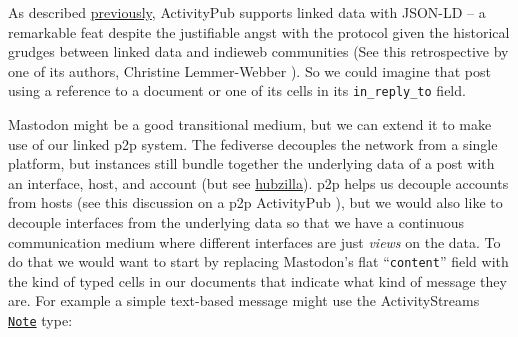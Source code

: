 \begin{Shaded}
\begin{Highlighting}[]
\FunctionTok{\{}
    \FunctionTok{:} \FunctionTok{,}
    \FunctionTok{:} \FunctionTok{,}
    \FunctionTok{:} \FunctionTok{,}
    \FunctionTok{:} \FunctionTok{,}
    \FunctionTok{:} \FunctionTok{,}
    \FunctionTok{:} \FunctionTok{,}
    \FunctionTok{:} \FunctionTok{,}
    \FunctionTok{:}
    \FunctionTok{\{}
        \FunctionTok{:} \FunctionTok{,}
        \FunctionTok{:} \FunctionTok{,}
        \FunctionTok{:}
        \OtherTok{[}  \OtherTok{]}
    \FunctionTok{\},}
    \FunctionTok{:} \OtherTok{[]}\FunctionTok{,}
    \FunctionTok{:} \OtherTok{[]}\FunctionTok{,}
    \FunctionTok{:} \OtherTok{[]}\FunctionTok{,}
\FunctionTok{\}}
\end{Highlighting}
\end{Shaded}

As described
\protect\hyperlink{for-making-our-peers-and-the-links-within-their-namespace-discov}{previously},
ActivityPub supports linked data with JSON-LD -- a remarkable feat
despite the justifiable angst with the protocol \citep{kaniiniActivityPubPresentState2019, schubertActivityPubFinalThoughts2019}  given the historical grudges between linked data and indieweb
communities (See this retrospective by one of its authors, Christine
Lemmer-Webber \citep{lemmer-webberStandardsDivisionsCollaboration2018} ). So we could imagine that post using a reference to a document or
one of its cells in its \texttt{in\_reply\_to} field.

Mastodon might be a good transitional medium, but we can extend it to
make use of our linked p2p system. The fediverse decouples the network
from a single platform, but instances still bundle together the
underlying data of a post with an interface, host, and account (but see
\href{https://hubzilla.org//page/hubzilla/hubzilla-project}{hubzilla}).
p2p helps us decouple accounts from hosts (see this discussion on a p2p
ActivityPub \citep{webberActivityPubDecentralizedDistributed2017} ), but we would also like to decouple interfaces from the underlying
data so that we have a continuous communication medium where different
interfaces are just \emph{views} on the data. To do that we would want
to start by replacing Mastodon's flat ``\texttt{content}'' field with
the kind of typed cells in our documents that indicate what kind of
message they are. For example a simple text-based message might use the
ActivityStreams
\href{https://www.w3.org/TR/activitystreams-vocabulary/\#dfn-note}{\texttt{Note}}
type:

